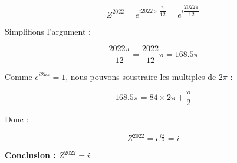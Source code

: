 \documentclass[a4paper,12pt]{article}
\begin{document}
\begin{solutionbox}
\begin{enumerate}
    \[
    Z^{2022} = e^{i 2022 \times \dfrac{\pi}{12}} = e^{i \dfrac{2022\pi}{12}}
    \]
    
    Simplifions l'argument :
    
    \[
    \dfrac{2022\pi}{12} = \dfrac{2022}{12} \pi = 168.5 \pi
    \]
    
    Comme \( e^{i 2k\pi} = 1 \), nous pouvons soustraire les multiples de \( 2\pi \) :
    
    \[
    168.5 \pi = 84 \times 2\pi + \frac{\pi}{2}
    \]
    
    Donc :
    
    \[
    Z^{2022} = e^{i\frac{\pi}{2}} = i
    \]
    
    \textbf{Conclusion :} \( Z^{2022} = i \)
\end{enumerate}
\end{solutionbox}
\end{document}
